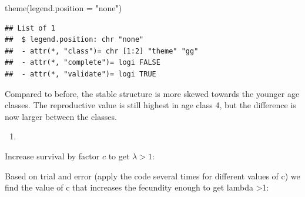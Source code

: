 \documentclass[
]{book}
\newenvironment{Shaded}{\begin{snugshade}}{\end{snugshade}}
\newcommand{\AttributeTok}[1]{\textcolor[rgb]{0.77,0.63,0.00}{#1}}
\newcommand{\CommentTok}[1]{\textcolor[rgb]{0.56,0.35,0.01}{\textit{#1}}}
\newcommand{\DecValTok}[1]{\textcolor[rgb]{0.00,0.00,0.81}{#1}}
\newcommand{\FloatTok}[1]{\textcolor[rgb]{0.00,0.00,0.81}{#1}}
\newcommand{\FunctionTok}[1]{\textcolor[rgb]{0.00,0.00,0.00}{#1}}
\newcommand{\NormalTok}[1]{#1}
\newcommand{\OtherTok}[1]{\textcolor[rgb]{0.56,0.35,0.01}{#1}}
\newcommand{\SpecialCharTok}[1]{\textcolor[rgb]{0.00,0.00,0.00}{#1}}
\newcommand{\StringTok}[1]{\textcolor[rgb]{0.31,0.60,0.02}{#1}}
\providecommand{\tightlist}{%
  \setlength{\itemsep}{0pt}\setlength{\parskip}{0pt}}
\begin{document}
\begin{Shaded}
\begin{Highlighting}[]
  \FunctionTok{theme}\NormalTok{(}\AttributeTok{legend.position =} \StringTok{"none"}\NormalTok{)  }
\end{Highlighting}
\end{Shaded}

\begin{verbatim}
## List of 1
##  $ legend.position: chr "none"
##  - attr(*, "class")= chr [1:2] "theme" "gg"
##  - attr(*, "complete")= logi FALSE
##  - attr(*, "validate")= logi TRUE
\end{verbatim}

Compared to before, the stable structure is more skewed towards the younger age classes. The reproductive value is still highest in age class 4, but the difference is now larger between the classes.

\begin{enumerate}
\def\labelenumi{\arabic{enumi}.}
\setcounter{enumi}{7}
\tightlist
\item
\end{enumerate}

Increase survival by factor \(c\) to get \(\lambda>1\):

Based on trial and error (apply the code several times for different values of c) we find the value of c that increases the fecundity enough to get lambda \textgreater1:

\begin{Shaded}
\end{Shaded}
\end{document}
